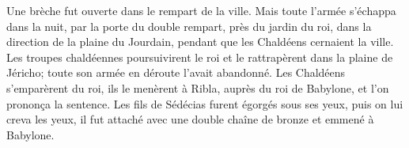Une brèche fut ouverte dans le rempart de la ville.
Mais toute l’armée s’échappa dans la nuit, par la porte du double rempart,
	près du jardin du roi, dans la direction de la plaine du Jourdain,
	pendant que les Chaldéens cernaient la ville.
Les troupes chaldéennes poursuivirent le roi et le rattrapèrent dans la plaine de Jéricho;
	toute son armée en déroute l’avait abandonné.
Les Chaldéens s’emparèrent du roi, ils le menèrent à Ribla, auprès du roi de Babylone,
	et l’on prononça la sentence.
Les fils de Sédécias furent égorgés sous ses yeux, puis on lui creva les yeux,
	il fut attaché avec une double chaîne de bronze et emmené à Babylone.
